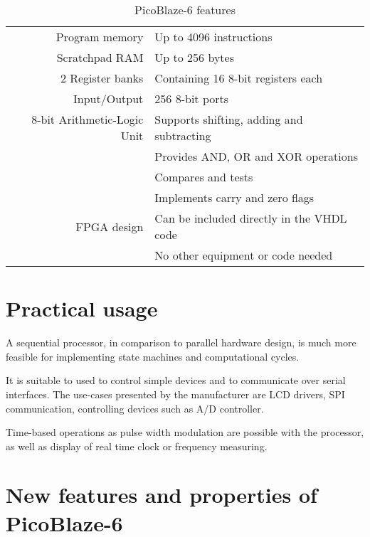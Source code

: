     \begin{table}[H]
    \centering
    \begin{tabular}{ @{\extracolsep{\fill} } r | l }
        Program memory & Up to 4096 instructions \\

        Scratchpad RAM & Up to 256 bytes \\

        2 Register banks & Containing 16 8-bit registers each\\

        Input/Output & 256 8-bit ports \\

        8-bit Arithmetic-Logic Unit & Supports shifting, adding and subtracting \\
                                    & Provides AND, OR and XOR operations \\
                                    & Compares and tests \\
                                    & Implements carry and zero flags \\

        FPGA design & Can be included directly in the VHDL code \\
                    & No other equipment or code needed \\
    \end{tabular}
    \caption{PicoBlaze-6 features}
    \end{table}

    \section{Practical usage}

    A sequential processor, in comparison to parallel hardware design, is much more feasible for implementing state machines and computational cycles.

    It is suitable to used to control simple devices and to communicate over serial interfaces. The use-cases presented by the manufacturer are LCD drivers, SPI communication, controlling devices such as A/D controller.

    Time-based operations as pulse width modulation are possible with the processor, as well as display of real time clock or frequency measuring.\cite{PicoBlazeExamples}

    \section{New features and properties of PicoBlaze-6}\label{kcpsm6cmp}


